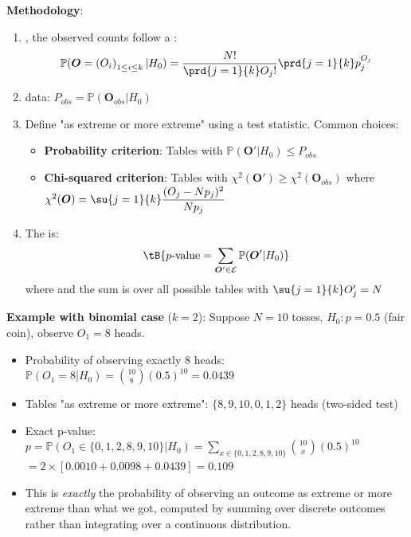 \textbf{Methodology}:
\begin{enumerate}
    \item {}, the observed counts follow a :
        $$\mathbb{P}(\bm{O} = \left(O_i\right)_{1\leq i\leq k} | H_0) = \dfrac{N!}{\prd{j=1}{k}O_j!} \prd{j=1}{k}p_j^{O_j}$$

    \item {} data: $P_{obs} = \mathbb{P}(\bm{O}_{obs} | H_0)$

    \item Define "as extreme or more extreme" using a test statistic. Common choices:
        \begin{itemize}
            \item \textbf{Probability criterion}: Tables with $\mathbb{P}(\bm{O}' | H_0) \leq P_{obs}$
            \item \textbf{Chi-squared criterion}: Tables with $\chi^2(\bm{O}') \geq \chi^2(\bm{O}_{obs})$ where
                $\chi^2(\bm{O}) = \su{j=1}{k}\dfrac{(O_j - Np_j)^2}{Np_j}$
        \end{itemize}

    \item The  is:
        $$\tB{p\text{-value} = \sum_{\bm{O}' \in \mathcal{E}} \mathbb{P}(\bm{O}' | H_0)}$$
        where 
        and the sum is over all possible tables with $\su{j=1}{k}O'_j = N$
\end{enumerate}

\textbf{Example with binomial case} ($k=2$): Suppose $N=10$ tosses, $H_0: p=0.5$ (fair coin), observe $O_1=8$ heads.
\begin{itemize}
    \item Probability of observing exactly 8 heads: $\mathbb{P}(O_1=8 | H_0) = \binom{10}{8}(0.5)^{10} = 0.0439$
    \item Tables "as extreme or more extreme": $\{8, 9, 10, 0, 1, 2\}$ heads (two-sided test)
    \item Exact p-value: $p = \mathbb{P}(O_1 \in \{0,1,2,8,9,10\} | H_0) = \sum_{x \in \{0,1,2,8,9,10\}} \binom{10}{x}(0.5)^{10}$
        $= 2 \times [0.0010 + 0.0098 + 0.0439] = 0.109$
    \item This is \emph{exactly} the probability of observing an outcome as extreme or more extreme than what we got,
        computed by summing over discrete outcomes rather than integrating over a continuous distribution.
\end{itemize}


